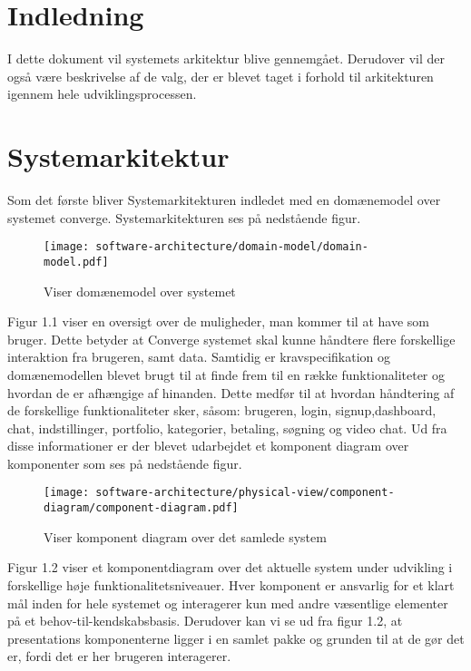 
\chapter{Indledning}

I dette dokument vil systemets arkitektur blive gennemgået. 
Derudover vil der også være beskrivelse af de valg, der er blevet taget i forhold til arkitekturen igennem hele udviklingsprocessen. 
    
\chapter{Systemarkitektur}

Som det første bliver Systemarkitekturen indledet med en domænemodel over systemet converge. Systemarkitekturen ses på nedstående figur.

\begin{figure}[H]
    \centering
\texttt{[image: software-architecture/domain-model/domain-model.pdf]}
\caption{Viser domænemodel over systemet}
\label{fig:figure4}
\end{figure}

Figur 1.1 viser en oversigt over de muligheder, man kommer til at have som bruger. Dette betyder at Converge systemet skal kunne håndtere flere forskellige interaktion fra brugeren, samt data. 
Samtidig er kravspecifikation og domænemodellen blevet brugt til at finde frem til en række funktionaliteter og hvordan de er afhængige af hinanden. Dette medfør til at hvordan håndtering af de forskellige funktionaliteter sker, såsom: brugeren, login, signup,dashboard, chat, indstillinger, portfolio, kategorier, betaling, søgning og video chat. Ud fra disse informationer er der blevet udarbejdet et komponent diagram over komponenter som ses på nedstående figur.

\begin{figure}[H]
    \centering
\texttt{[image: software-architecture/physical-view/component-diagram/component-diagram.pdf]}
\caption{Viser komponent diagram over det samlede system}
\label{fig:figure2}
\end{figure}

Figur 1.2 viser et komponentdiagram over det aktuelle system under udvikling i forskellige høje funktionalitetsniveauer. Hver komponent er ansvarlig for et klart mål inden for hele systemet og interagerer kun med andre væsentlige elementer på et behov-til-kendskabsbasis. Derudover kan vi se ud fra figur 1.2, at presentations komponenterne ligger i en samlet pakke og grunden til at de gør det er, fordi det er her brugeren interagerer.

